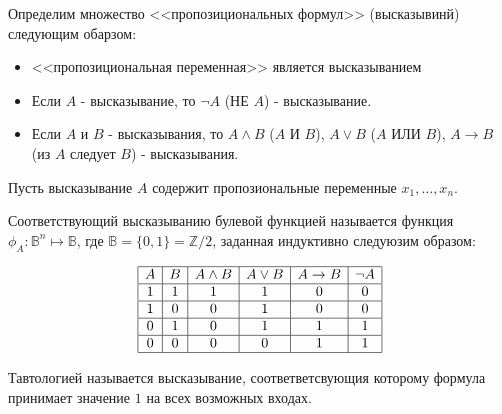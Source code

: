 \begin{definition} \thmslashn 

    Определим множество <<пропозициональных формул>> (высказывинй) следующим обарзом:

    \begin{itemize}
        \item <<пропозициональная переменная>> является высказыванием
        \item Если $A$ - высказывание, то $\neg A$ (НЕ $A$) - высказывание.
        \item Если $A$ и $B$ - высказывания, то $A \land B$ ($A$ И $B$), $A \lor B$ ($A$ ИЛИ $B$), $A \to B$ (из $A$ следует $B$) - высказывания.
    \end{itemize}
\end{definition}
\begin{definition} \thmslashn 

    Пусть высказывание $A$ содержит пропозиональные переменные $x_1, \ldots, x_{n}$.

    Соответствующий высказыванию булевой функцией называется функция $\phi_{A} : \mathbb{B}^{n} \mapsto \mathbb{B}$, где $\mathbb{B} = \{0, 1\} = \mathbb{Z}/2$, заданная индуктивно следуюзим образом:

    \begin{equation*}
        \begin{array}{|c|c|c|c|c|c|} \hline
            A & B & A \land B & A \lor B & A \to B & \neg A \\ \hline
            1 & 1 & 1 & 1 & 0 & 0\\ \hline
            1 & 0 & 0 & 1 & 0 & 0 \\ \hline
            0 & 1 & 0 & 1 & 1 & 1 \\ \hline
            0 & 0 & 0 & 0 & 1 & 1\\ \hline
        \end{array}
    \end{equation*}


\end{definition}

\begin{definition} \thmslashn 
    
    Тавтологией называется высказывание, соответветсвующия которому формула принимает значение $1$ на всех возможных входах. 

\end{definition}

